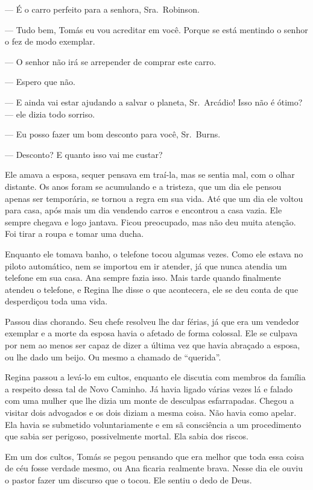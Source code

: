 --- É o carro perfeito para a senhora, Sra.~Robinson.

--- Tudo bem, Tomás eu vou acreditar em você. Porque se está mentindo\mudanca{,} o senhor o fez de modo exemplar.

--- O senhor não irá se arrepender de comprar este carro.

--- Espero que não.

--- E ainda vai estar ajudando a salvar o planeta, Sr.~Arcádio! Isso não é ótimo? --- ele dizia todo sorriso.

---  Eu posso fazer um bom desconto para você, Sr.~Burns.

---  Desconto? E quanto isso vai me custar?

Ele amava a esposa,  sequer pensava em traí-la, mas se sentia mal, com o olhar distante. Os anos foram se acumulando e a tristeza, que um dia ele pensou apenas ser temporária, se tornou a regra em sua vida. Até que um dia ele voltou para casa, após mais um dia vendendo carros e encontrou a casa vazia. Ele sempre chegava e logo jantava. Ficou preocupado, mas não deu muita atenção. Foi tirar a roupa e tomar uma ducha.

Enquanto ele tomava banho, o telefone tocou algumas vezes. Como ele estava no piloto automático, nem se importou em ir atender, já que nunca atendia um telefone em sua casa. Ana sempre fazia isso. Mais tarde quando finalmente atendeu o telefone, e Regina lhe disse o que acontecera, ele se deu conta de que desperdiçou toda uma vida.

Passou dias chorando. Seu chefe resolveu lhe dar férias, já que era um vendedor exemplar e a morte da esposa havia o afetado de forma colossal. Ele se culpava por nem ao menos ser capaz de dizer a última vez que havia abraçado a esposa, ou lhe dado um beijo. Ou mesmo a chamado de ``querida''.

Regina passou a levá-lo em cultos, enquanto ele discutia com membros da família a respeito dessa tal de Novo Caminho. Já havia ligado várias vezes lá e falado com uma mulher que lhe dizia um monte de desculpas esfarrapadas. Chegou a visitar dois advogados e os dois diziam a mesma coisa. Não havia como apelar. Ela havia se submetido voluntariamente e em sã consciência a um procedimento que sabia ser perigoso, possivelmente mortal. Ela sabia dos riscos.

Em um dos cultos, Tomás se pegou pensando que era melhor que toda essa coisa de céu fosse verdade mesmo, ou Ana ficaria realmente brava. Nesse dia ele ouviu o pastor fazer um discurso que o tocou. Ele sentiu o dedo de Deus.

